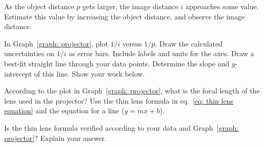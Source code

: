 \documentclass[addpoints]{physlabs}
\begin{document}
\begin{postlab}
        \filbreak
        \question[1] As the object distance $p$ gets larger, the image distance $i$ approaches some value. Estimate this value by increasing the object distance, and observe the image distance.
        \begin{solution}[4cm]
            
        \end{solution}

        \filbreak
        \question[2] In Graph~\ref{graph: projector}, plot $1/i$ versus $1/p$. Draw the calculated uncertainties on $1/i$ as error bars. Include labels and units for the axes. Draw a best-fit straight line through your data points. Determine the slope and $y$-intercept of this line. Show your work below.

        \begin{center}
        \captionsetup{font=normalsize}
        \end{center}
        \begin{solution}[1cm]
        \end{solution}

        \filbreak
        \question[1] According to the plot in Graph~\ref{graph: projector}, what is the focal length of the lens used in the projector? Use the thin lens formula in eq.~\ref{eq: thin lens equation} and the equation for a line ($y=mx+b$).
        \begin{solution}[2cm]
        \end{solution}

        \filbreak
        \question[1] Is the thin lens formula verified according to your data and Graph~\ref{graph: projector}? Explain your answer.
        \begin{solution}[2cm]
        \end{solution}


\end{postlab}
\end{document}
